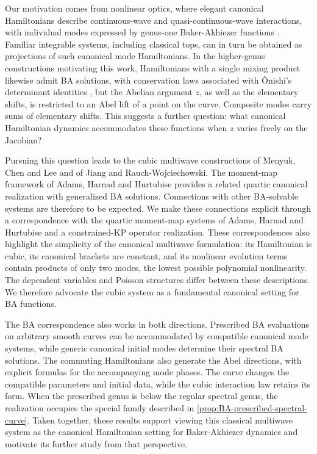 Our motivation comes from nonlinear optics, where elegant canonical
Hamiltonians describe continuous-wave and quasi-continuous-wave
interactions, with individual modes expressed by genus-one
Baker-Akhiezer functions \cite{Hesketh2015,HeskethFWM2026}.
Familiar integrable systems, including classical tops, can in turn
be obtained as projections of such canonical mode Hamiltonians.
In the higher-genus constructions motivating this work,
Hamiltonians with a single mixing product likewise admit BA solutions,
with conservation laws associated with \^Onishi's determinant
identities \cite{HeskethHyperelliptic2026}, but the Abelian argument $z$,
as well as the elementary shifts, is restricted to an Abel lift of
a point on the curve. Composite modes carry sums of elementary
shifts. This suggests a further question: what canonical Hamiltonian
dynamics accommodates these functions when $z$ varies freely on the
Jacobian?

Pursuing this question leads to the cubic multiwave constructions
of Menyuk, Chen and Lee and of Jiang and Rauch-Wojciechowski.
The moment-map framework of Adams, Harnad and Hurtubise provides
a related quartic canonical realization with generalized BA solutions.
Connections with other BA-solvable systems are therefore to be
expected. We make these connections explicit through a correspondence
with the quartic moment-map systems of Adams, Harnad and Hurtubise
and a constrained-KP operator realization. These correspondences also
highlight the simplicity of the canonical multiwave formulation:
its Hamiltonian is cubic, its canonical brackets are constant, and
its nonlinear evolution terms contain products of only two modes,
the lowest possible polynomial nonlinearity. The dependent variables
and Poisson structures differ between these descriptions. We therefore
advocate the cubic system as a fundamental canonical setting for BA
functions.

The BA correspondence also works in both directions. Prescribed BA
evaluations on arbitrary smooth curves can
be accommodated by compatible canonical mode systems, while generic
canonical initial modes determine their spectral BA solutions. The
commuting Hamiltonians also generate the Abel directions, with
explicit formulas for the accompanying mode phases. The curve changes
the compatible parameters and initial data, while the cubic interaction
law retains its form. When the prescribed genus is below the regular
spectral genus, the realization occupies the special family described
in \cref{prop:BA-prescribed-spectral-curve}. Taken together, these results support viewing
this classical multiwave system as the canonical Hamiltonian setting
for Baker-Akhiezer dynamics and motivate its further study from that
perspective.

